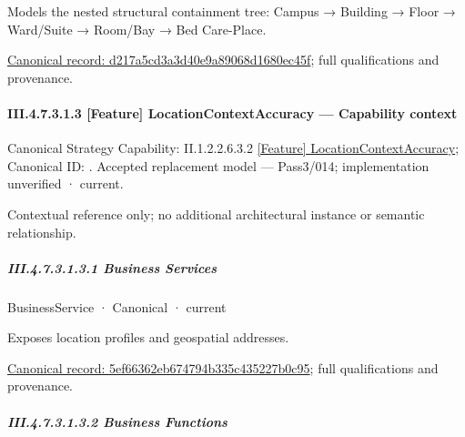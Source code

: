 Models the nested structural containment tree: Campus → Building → Floor → Ward/Suite → Room/Bay → Bed Care-Place.


{\footnotesize \href{../../../../../../../../continuum/business/business-function/d217a5cd3a3d40e9a89068d1680ec45f.md}{Canonical record: d217a5cd3a3d40e9a89068d1680ec45f}; full qualifications and provenance.}\par
\paragraph*{III.4.7.3.1.3 [Feature] LocationContextAccuracy — Capability context}
\label{navigation:III.4.7.3.1.3}

{\small Canonical Strategy Capability: II.1.2.2.6.3.2 \hyperref[element:84742d2e91364e67ac72cce991bca3a6]{[Feature] LocationContextAccuracy}; Canonical ID: \texttt{}. Accepted replacement model — Pass3/014; implementation unverified · current.}\par
Contextual reference only; no additional architectural instance or semantic relationship.\par
\subparagraph*{III.4.7.3.1.3.1 Business Services}
\label{navigation:III.4.7.3.1.3.1}

\label{navigation:III.4.7.3.1.3.1.1}

\label{element:5ef66362eb674794b335c435227b0c95}
{\small BusinessService · Canonical · current}\par

Exposes location profiles and geospatial addresses.


{\footnotesize \href{../../../../../../../../continuum/business/business-service/5ef66362eb674794b335c435227b0c95.md}{Canonical record: 5ef66362eb674794b335c435227b0c95}; full qualifications and provenance.}\par
\subparagraph*{III.4.7.3.1.3.2 Business Functions}
\label{navigation:III.4.7.3.1.3.2}

\label{navigation:III.4.7.3.1.3.2.1}

